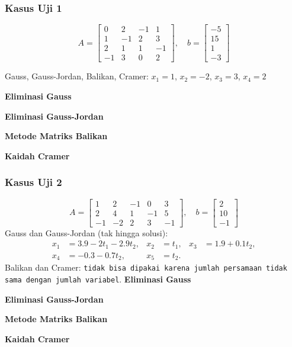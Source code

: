 \subsubsection{Kasus Uji 1}
\begin{kasus}
\[
A = \begin{bmatrix}
0 & 2 & -1 & 1 \\
1 & -1 & 2 & 3 \\
2 & 1 & 1 & -1 \\
-1 & 3 & 0 & 2
\end{bmatrix}, \quad
b = \begin{bmatrix} -5 \\ 15 \\ 1 \\ -3 \end{bmatrix}
\]
\begin{center}
Gauss, Gauss-Jordan, Balikan, Cramer: $x_1 = 1$, $x_2 = -2$, $x_3 = 3$, $x_4 = 2$
\end{center}
\textbf{Eliminasi Gauss}

\textbf{Eliminasi Gauss-Jordan}

\textbf{Metode Matriks Balikan}

\textbf{Kaidah Cramer}
\end{kasus}

\subsubsection{Kasus Uji 2}
\begin{kasus}
\[
A = \begin{bmatrix}
1 & 2 & -1 & 0 & 3 \\
2 & 4 & 1 & -1 & 5 \\
-1 & -2 & 2 & 3 & -1
\end{bmatrix}, \quad
b = \begin{bmatrix} 2 \\ 10 \\ -1 \end{bmatrix}
\]
Gauss dan Gauss-Jordan (tak hingga solusi):
\begin{align*}
x_1 &= 3.9 - 2t_1 - 2.9t_2, & x_2 &= t_1, & x_3 &= 1.9 + 0.1t_2, \\
x_4 &= -0.3 - 0.7t_2, & x_5 &= t_2 .
\end{align*}
Balikan dan Cramer: \texttt{tidak bisa dipakai karena jumlah persamaan tidak sama dengan jumlah variabel}.
\textbf{Eliminasi Gauss}

\textbf{Eliminasi Gauss-Jordan}

\textbf{Metode Matriks Balikan}

\textbf{Kaidah Cramer}
\end{kasus}

